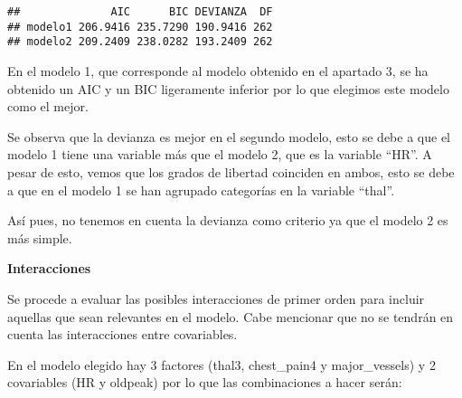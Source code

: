 \documentclass[]{article}
\newenvironment{Shaded}{\begin{snugshade}}{\end{snugshade}}
\newcommand{\KeywordTok}[1]{\textcolor[rgb]{0.13,0.29,0.53}{\textbf{#1}}}
\newcommand{\DataTypeTok}[1]{\textcolor[rgb]{0.13,0.29,0.53}{#1}}
\newcommand{\DecValTok}[1]{\textcolor[rgb]{0.00,0.00,0.81}{#1}}
\newcommand{\StringTok}[1]{\textcolor[rgb]{0.31,0.60,0.02}{#1}}
\newcommand{\OperatorTok}[1]{\textcolor[rgb]{0.81,0.36,0.00}{\textbf{#1}}}
\newcommand{\NormalTok}[1]{#1}
\begin{document}
\begin{Shaded}
\end{Shaded}

\begin{verbatim}
##              AIC      BIC DEVIANZA  DF
## modelo1 206.9416 235.7290 190.9416 262
## modelo2 209.2409 238.0282 193.2409 262
\end{verbatim}

En el modelo 1, que corresponde al modelo obtenido en el apartado 3, se
ha obtenido un AIC y un BIC ligeramente inferior por lo que elegimos
este modelo como el mejor.

Se observa que la devianza es mejor en el segundo modelo, esto se debe a
que el modelo 1 tiene una variable más que el modelo 2, que es la
variable ``HR''. A pesar de esto, vemos que los grados de libertad
coinciden en ambos, esto se debe a que en el modelo 1 se han agrupado
categorías en la variable ``thal''.

Así pues, no tenemos en cuenta la devianza como criterio ya que el
modelo 2 es más simple.

\textbf{Interacciones}

Se procede a evaluar las posibles interacciones de primer orden para
incluir aquellas que sean relevantes en el modelo. Cabe mencionar que no
se tendrán en cuenta las interacciones entre covariables.

En el modelo elegido hay 3 factores (thal3, chest\_pain4 y
major\_vessels) y 2 covariables (HR y oldpeak) por lo que las
combinaciones a hacer serán:
\end{document}

